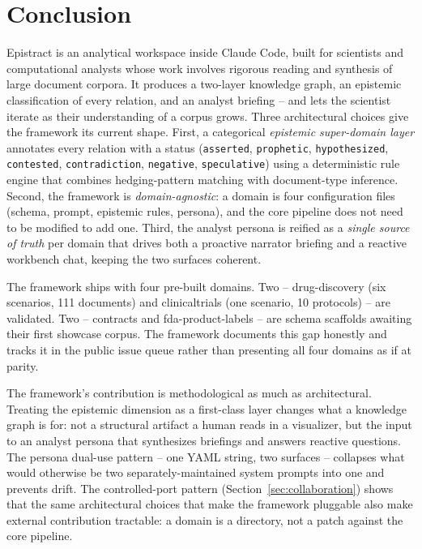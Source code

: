 \section{Conclusion}
\label{sec:conclusion}

Epistract is an analytical workspace inside Claude Code, built for scientists and computational analysts whose work involves rigorous reading and synthesis of large document corpora. It produces a two-layer knowledge graph, an epistemic classification of every relation, and an analyst briefing -- and lets the scientist iterate as their understanding of a corpus grows. Three architectural choices give the framework its current shape. First, a categorical \emph{epistemic super-domain layer} annotates every relation with a status (\texttt{asserted}, \texttt{prophetic}, \texttt{hypothesized}, \texttt{contested}, \texttt{contradiction}, \texttt{negative}, \texttt{speculative}) using a deterministic rule engine that combines hedging-pattern matching with document-type inference. Second, the framework is \emph{domain-agnostic}: a domain is four configuration files (schema, prompt, epistemic rules, persona), and the core pipeline does not need to be modified to add one. Third, the analyst persona is reified as a \emph{single source of truth} per domain that drives both a proactive narrator briefing and a reactive workbench chat, keeping the two surfaces coherent.

The framework ships with four pre-built domains. Two -- drug-discovery (six scenarios, 111 documents) and clinicaltrials (one scenario, 10 protocols) -- are validated. Two -- contracts and fda-product-labels -- are schema scaffolds awaiting their first showcase corpus. The framework documents this gap honestly and tracks it in the public issue queue rather than presenting all four domains as if at parity.

The framework's contribution is methodological as much as architectural. Treating the epistemic dimension as a first-class layer changes what a knowledge graph is for: not a structural artifact a human reads in a visualizer, but the input to an analyst persona that synthesizes briefings and answers reactive questions. The persona dual-use pattern -- one YAML string, two surfaces -- collapses what would otherwise be two separately-maintained system prompts into one and prevents drift. The controlled-port pattern (Section~\ref{sec:collaboration}) shows that the same architectural choices that make the framework pluggable also make external contribution tractable: a domain is a directory, not a patch against the core pipeline.

